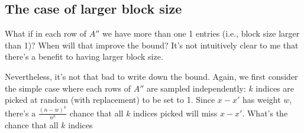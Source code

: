 \documentclass[11pt]{article}
\begin{document}
\subsection{The case of larger block size}
\label{subsec:block_size_larger}

What if in each row of $A''$ we have more than one 1 entries (i.e., block size
larger than 1)?
When will that improve the bound?
It's not intuitively clear to me that there's a benefit to having larger block
size.

Nevertheless, it's not that bad to write down the bound.
Again, we first consider the simple case where each rows of $A''$ are sampled
independently: $k$ indices are picked at random (with replacement) to be set to
1.
Since $x - x'$ has weight $w$, there's a $\frac{(n - w)^k}{n^k}$ chance that all
$k$ indices picked will miss $x - x'$.
What's the chance that all $k$ indices 


\end{document}
